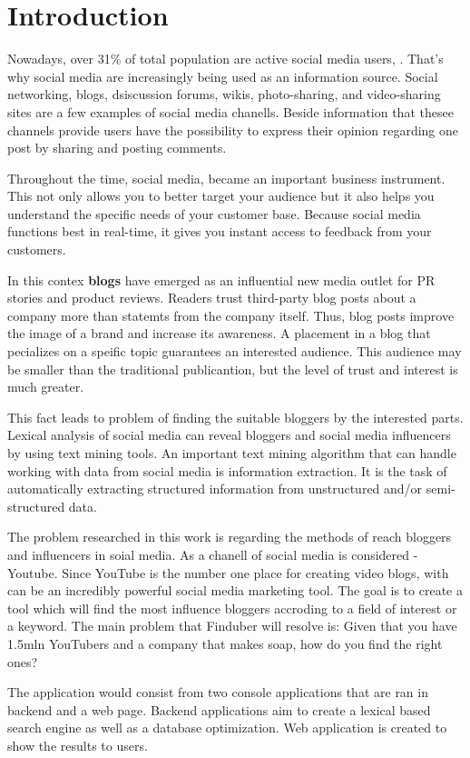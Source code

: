 \section*{Introduction}

\setcounter{page}{13}

Nowadays, over 31\% of total population are active social media users, \cite{SMResearch}. That's why social media are increasingly being used as an information source. Social networking, blogs, dsiscussion forums, wikis, photo-sharing, and video-sharing sites are a few examples of social media chanells. Beside information that thesee channels provide users have the possibility to express their opinion regarding one post by sharing and posting comments.

Throughout the time, social media, became an important business instrument. This not only allows you to better target your audience but it also helps you understand the specific needs of your customer base. Because social media functions best in real-time, it gives you instant access to feedback from your customers. 

In this contex \textbf{blogs} have emerged as an influential new media outlet for PR stories and product reviews. Readers trust third-party blog posts about a company more than statemts from the company itself. Thus, blog posts improve the image of a brand and increase its awareness. A placement in a blog that pecializes on a speific topic guarantees an interested audience. This audience may be smaller than the traditional publicantion, but the level of trust and interest is much greater. 

This fact leads to problem of finding the suitable bloggers by the interested parts. Lexical analysis of social media can reveal bloggers and social media influencers by using text mining tools. An important text mining algorithm that can handle working with data from social media is information extraction. It is the task of automatically extracting structured information from unstructured and/or semi-structured data.

The problem researched in this work is regarding the methods of reach bloggers and influencers in soial media. As a chanell of social media is considered - Youtube. Since YouTube is the number one place for creating video blogs, with can be an incredibly powerful social media marketing tool. The goal is to create a tool which will find the most influence bloggers accroding to a field of interest or a keyword. The main problem that Finduber will resolve is: Given that you have 1.5mln YouTubers and a company that makes soap, how do you find the right ones?

The application would consist from two console applications that are ran in backend and a web page. Backend applications aim to create a lexical based search engine as well as a database optimization. Web application is created to show the results to users.

\clearpage